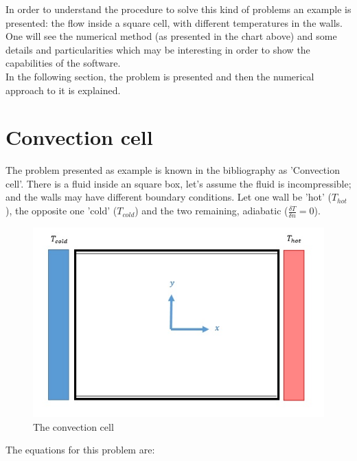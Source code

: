 \vspace{1cm}

In order to understand the procedure to solve this kind of problems an example
is presented: the flow inside a square cell, with different temperatures in the
walls. One will see the numerical method (as presented in the chart above) and
some details and particularities which may be interesting in order to show the
capabilities of the software.\\

 In the following section, the problem is presented and then the numerical
 approach to it is explained. \\


\newpage

\section{Convection cell}

The problem presented as example is known in the bibliography as 'Convection
cell'. There is a fluid inside an square box, let's assume the fluid is
incompressible; and the walls may have different boundary conditions. Let one
wall be 'hot' ($T_{hot}$), the opposite one 'cold' ($T_{cold}$) and the two
remaining, adiabatic ($\frac{\delta T}{\delta n}=0$).\\

\begin{figure}[h]
\centering
\includegraphics[scale=0.8, trim = 5mm 0mm 0mm 0mm, clip]{./Figures/4-IVBP/figure_0.jpg}
\caption{The convection cell}
\end{figure}

The equations for this problem are: 

